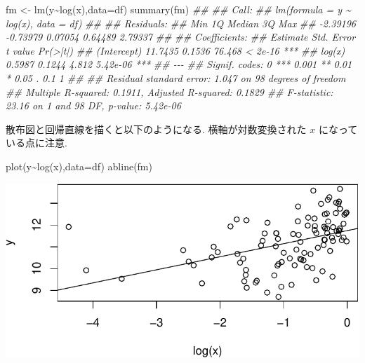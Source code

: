 \documentclass[
  letterpaper,
  xelatex,
  ja=standard, xelatex]{bxjsbook}
\newenvironment{Shaded}{\begin{snugshade}}{\end{snugshade}}
\newcommand{\AttributeTok}[1]{\textcolor[rgb]{0.40,0.45,0.13}{#1}}
\newcommand{\DocumentationTok}[1]{\textcolor[rgb]{0.37,0.37,0.37}{\textit{#1}}}
\newcommand{\FunctionTok}[1]{\textcolor[rgb]{0.28,0.35,0.67}{#1}}
\newcommand{\NormalTok}[1]{\textcolor[rgb]{0.00,0.23,0.31}{#1}}
\newcommand{\OtherTok}[1]{\textcolor[rgb]{0.00,0.23,0.31}{#1}}
\newcommand{\SpecialCharTok}[1]{\textcolor[rgb]{0.37,0.37,0.37}{#1}}
\begin{document}
\begin{Shaded}
\begin{Highlighting}[]
\NormalTok{fm }\OtherTok{\textless{}{-}} \FunctionTok{lm}\NormalTok{(y}\SpecialCharTok{\textasciitilde{}}\FunctionTok{log}\NormalTok{(x),}\AttributeTok{data=}\NormalTok{df)}
\FunctionTok{summary}\NormalTok{(fm)}
\DocumentationTok{\#\# }
\DocumentationTok{\#\# Call:}
\DocumentationTok{\#\# lm(formula = y \textasciitilde{} log(x), data = df)}
\DocumentationTok{\#\# }
\DocumentationTok{\#\# Residuals:}
\DocumentationTok{\#\#      Min       1Q   Median       3Q      Max }
\DocumentationTok{\#\# {-}2.39196 {-}0.73979  0.07054  0.64489  2.79337 }
\DocumentationTok{\#\# }
\DocumentationTok{\#\# Coefficients:}
\DocumentationTok{\#\#             Estimate Std. Error t value Pr(\textgreater{}|t|)    }
\DocumentationTok{\#\# (Intercept)  11.7435     0.1536  76.468  \textless{} 2e{-}16 ***}
\DocumentationTok{\#\# log(x)        0.5987     0.1244   4.812 5.42e{-}06 ***}
\DocumentationTok{\#\# {-}{-}{-}}
\DocumentationTok{\#\# Signif. codes:  0 \textquotesingle{}***\textquotesingle{} 0.001 \textquotesingle{}**\textquotesingle{} 0.01 \textquotesingle{}*\textquotesingle{} 0.05 \textquotesingle{}.\textquotesingle{} 0.1 \textquotesingle{} \textquotesingle{} 1}
\DocumentationTok{\#\# }
\DocumentationTok{\#\# Residual standard error: 1.047 on 98 degrees of freedom}
\DocumentationTok{\#\# Multiple R{-}squared:  0.1911, Adjusted R{-}squared:  0.1829 }
\DocumentationTok{\#\# F{-}statistic: 23.16 on 1 and 98 DF,  p{-}value: 5.42e{-}06}
\end{Highlighting}
\end{Shaded}

散布図と回帰直線を描くと以下のようになる. 横軸が対数変換された \(x\)
になっている点に注意.

\begin{Shaded}
\begin{Highlighting}[]
\FunctionTok{plot}\NormalTok{(y}\SpecialCharTok{\textasciitilde{}}\FunctionTok{log}\NormalTok{(x),}\AttributeTok{data=}\NormalTok{df)}
\FunctionTok{abline}\NormalTok{(fm)}
\end{Highlighting}
\end{Shaded}

\includegraphics{07-regression1_files/figure-pdf/unnamed-chunk-21-1.pdf}
\end{document}
